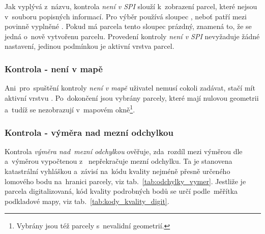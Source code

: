 Jak vyplývá z~názvu, kontrola \textit{není v SPI} slouží k~zobrazení parcel, které nejsou v~souboru popisných informací. Pro výběr používá sloupec , neboť patří mezi povinně vyplněné \citep{struktura_vfk}. Pokud má parcela tento sloupec prázdný, znamená to, že se jedná o~nově vytvořenu parcelu. Provedení kontroly \textit{není v SPI} nevyžaduje žádné nastavení, jedinou podmínkou je aktivní vrstva parcel.

\subsubsection{Kontrola - není v mapě}
\label{kontrola_neni_v_mape}

Ani~pro~spuštění kontroly \textit{není v mapě} uživatel nemusí cokoli zadávat, stačí mít aktivní vrstvu . Po~dokončení jsou vybrány parcely, které mají nulovou geometrii a~tudíž se nezobrazují v~mapovém okně\footnote{Vybrány jsou též parcely s~nevalidní geometrií.}.

\subsubsection{Kontrola - výměra nad mezní odchylkou}
\label{kontrola_vymera}

Kontrola \textit{výměra nad~mezní odchylkou} ověřuje, zda~rozdíl mezi výměrou dle~ a~výměrou vypočtenou z~ nepřekračuje mezní odchylku. Ta je stanovena katastrální vyhláškou \citep{vyhlaska_357} a~závisí na~kódu kvality nejméně přesně určeného lomového bodu na~hranici parcely, viz tab.~\ref{tab:odchylky_vymer}. Jestliže je parcela digitalizovaná, kód kvality podrobných bodů se určí podle~měřítka podkladové mapy, viz tab.~\ref{tab:kody_kvality_digit}.

